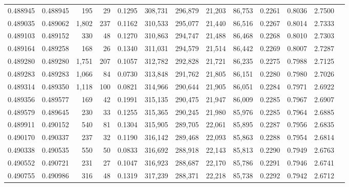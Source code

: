 \begin{tabular}{rrrrrrrrrrrrr}
0.488945 & 0.488945 &   195 &    29 &                                     0.1295 & 308,731 & 296,879 &  21,203 &  86,753 & 0.2261 & 0.8036 & 2.7500 \\
0.489035 & 0.489062 & 1,802 &   237 &                                     0.1162 & 310,533 & 295,077 &  21,440 &  86,516 & 0.2267 & 0.8014 & 2.7333 \\
0.489103 & 0.489152 &   330 &    48 &                                     0.1270 & 310,863 & 294,747 &  21,488 &  86,468 & 0.2268 & 0.8010 & 2.7303 \\
0.489164 & 0.489258 &   168 &    26 &                                     0.1340 & 311,031 & 294,579 &  21,514 &  86,442 & 0.2269 & 0.8007 & 2.7287 \\
0.489280 & 0.489280 & 1,751 &   207 &                                     0.1057 & 312,782 & 292,828 &  21,721 &  86,235 & 0.2275 & 0.7988 & 2.7125 \\
0.489283 & 0.489283 & 1,066 &    84 &                                     0.0730 & 313,848 & 291,762 &  21,805 &  86,151 & 0.2280 & 0.7980 & 2.7026 \\
0.489314 & 0.489350 & 1,118 &   100 &                                     0.0821 & 314,966 & 290,644 &  21,905 &  86,051 & 0.2284 & 0.7971 & 2.6922 \\
0.489356 & 0.489577 &   169 &    42 &                                     0.1991 & 315,135 & 290,475 &  21,947 &  86,009 & 0.2285 & 0.7967 & 2.6907 \\
0.489579 & 0.489645 &   230 &    33 &                                     0.1255 & 315,365 & 290,245 &  21,980 &  85,976 & 0.2285 & 0.7964 & 2.6885 \\
0.489911 & 0.490152 &   540 &    81 &                                     0.1304 & 315,905 & 289,705 &  22,061 &  85,895 & 0.2287 & 0.7956 & 2.6835 \\
0.490170 & 0.490337 &   237 &    32 &                                     0.1190 & 316,142 & 289,468 &  22,093 &  85,863 & 0.2288 & 0.7954 & 2.6814 \\
0.490338 & 0.490535 &   550 &    50 &                                     0.0833 & 316,692 & 288,918 &  22,143 &  85,813 & 0.2290 & 0.7949 & 2.6763 \\
0.490552 & 0.490721 &   231 &    27 &                                     0.1047 & 316,923 & 288,687 &  22,170 &  85,786 & 0.2291 & 0.7946 & 2.6741 \\
0.490755 & 0.490986 &   316 &    48 &                                     0.1319 & 317,239 & 288,371 &  22,218 &  85,738 & 0.2292 & 0.7942 & 2.6712 \\

\end{tabular}
